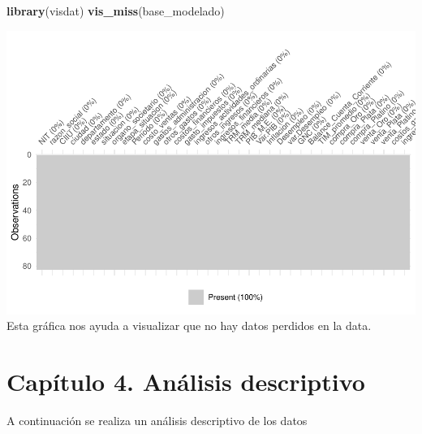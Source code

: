 \documentclass[
  11pt,
  a4paper,
]{book}
\newenvironment{Shaded}{\begin{snugshade}}{\end{snugshade}}
\newcommand{\DataTypeTok}[1]{\textcolor[rgb]{0.13,0.29,0.53}{#1}}
\newcommand{\DecValTok}[1]{\textcolor[rgb]{0.00,0.00,0.81}{#1}}
\newcommand{\FloatTok}[1]{\textcolor[rgb]{0.00,0.00,0.81}{#1}}
\newcommand{\KeywordTok}[1]{\textcolor[rgb]{0.13,0.29,0.53}{\textbf{#1}}}
\newcommand{\NormalTok}[1]{#1}
\newcommand{\OperatorTok}[1]{\textcolor[rgb]{0.81,0.36,0.00}{\textbf{#1}}}
\newcommand{\StringTok}[1]{\textcolor[rgb]{0.31,0.60,0.02}{#1}}
\begin{document}
\begin{Shaded}
\begin{Highlighting}[]
\KeywordTok{library}\NormalTok{(visdat)}
\KeywordTok{vis_miss}\NormalTok{(base_modelado)}
\end{Highlighting}
\end{Shaded}

\includegraphics{index_files/figure-latex/unnamed-chunk-4-1.pdf} Esta
gráfica nos ayuda a visualizar que no hay datos perdidos en la data.

\hypertarget{capuxedtulo-4.-anuxe1lisis-descriptivo}{%
\chapter{Capítulo 4. Análisis
descriptivo}\label{capuxedtulo-4.-anuxe1lisis-descriptivo}}

A continuación se realiza un análisis descriptivo de los datos

\begin{Shaded}
\end{Shaded}
\end{document}
